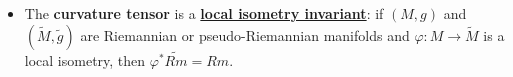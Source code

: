 \documentclass[11pt]{article}
\begin{document}
\begin{itemize}
\item \begin{proposition}
The \textbf{curvature tensor} is a \underline{\textbf{local isometry invariant}}: if $(M,g)$ and $(\widetilde{M}, \widetilde{g})$ are Riemannian or pseudo-Riemannian manifolds and $\varphi: M \rightarrow \widetilde{M}$ is a local isometry, then $\varphi^{*}\widetilde{Rm} = Rm$.
\end{proposition}
\end{itemize}

\newpage


\end{document}
